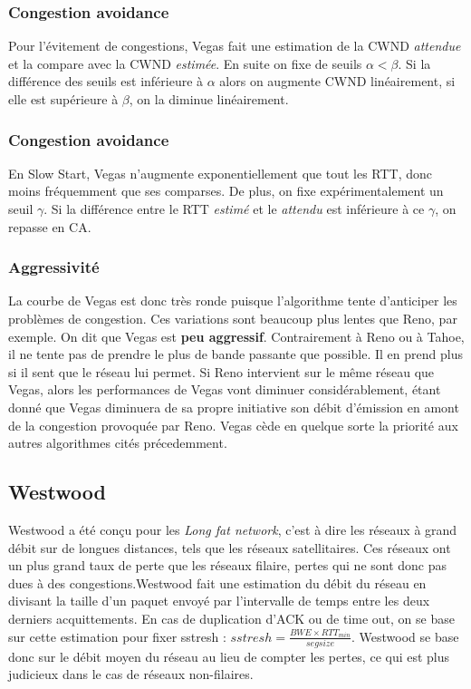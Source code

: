 \documentclass[	DIV=calc,%
							paper=a4,%
							fontsize=11pt,%
							twocolumn]{scrartcl}	 					%
\begin{document}
\subsubsection*{Congestion avoidance}
Pour l'évitement de congestions, Vegas fait une estimation de la CWND \textit{attendue} et la compare avec la CWND \textit{estimée}. En suite on fixe de seuils $\alpha<\beta$. Si la différence des seuils est inférieure à $\alpha$ alors on augmente CWND linéairement, si elle est supérieure à $ \beta $, on la diminue linéairement.
\subsubsection*{Congestion avoidance}
En Slow Start, Vegas n'augmente exponentiellement que tout les RTT, donc moins fréquemment que ses comparses. De plus, on fixe expérimentalement un seuil $\gamma$. Si la différence entre le RTT \textit{estimé} et le \textit{attendu} est inférieure à ce $\gamma$, on repasse en CA.
\subsubsection*{Aggressivité}
La courbe de Vegas est donc très ronde puisque l'algorithme tente d'anticiper les problèmes de congestion. Ces variations sont beaucoup plus lentes que Reno, par exemple. On dit que Vegas est \textbf{peu aggressif}. Contrairement à Reno ou à Tahoe, il ne tente pas de prendre le plus de bande passante que possible. Il en prend plus si il sent que le réseau lui permet. Si Reno intervient sur le même réseau que Vegas, alors les performances de Vegas vont diminuer considérablement, étant donné que Vegas diminuera de sa propre initiative son débit d'émission en amont de la congestion provoquée par Reno. Vegas cède en quelque sorte la priorité aux autres algorithmes cités précedemment.

\subsection*{Westwood}
Westwood a été conçu pour les \textit{Long fat network}, c'est à dire les réseaux à grand débit sur de longues distances, tels que les réseaux satellitaires. Ces réseaux ont un plus grand taux de perte que les réseaux filaire, pertes qui ne sont donc pas dues à des congestions.Westwood fait une estimation du débit du réseau en divisant la taille d'un paquet envoyé par l'intervalle de temps entre les deux derniers acquittements. En cas de duplication d'ACK ou de time out, on se base sur cette estimation pour fixer sstresh : $sstresh=\frac{BWE \times RTT_{min}}{segsize} $. Westwood se base donc sur le débit moyen du réseau au lieu de compter les pertes, ce qui est plus judicieux dans le cas de réseaux non-filaires.
\end{document}
